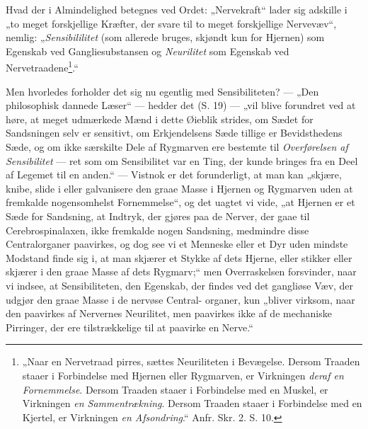 \documentclass[12pt,a4paper]{book}
\begin{document}
Hvad der i Almindelighed betegnes ved Ordet: „Nervekraft“ lader sig
adskille i „to meget forskjellige Kræfter, der svare til to meget
forskjellige Nervevæv“, nemlig: „\emph{Sensibililitet} (som allerede
bruges, skjøndt kun for Hjernen) som Egenskab ved Gangliesubstansen og
\emph{Neurilitet} som Egenskab ved
Nervetraadene\footnote{„Naar en Nervetraad pirres, sættes Neuriliteten i
Bevægelse. Dersom Traaden staaer i Forbindelse med Hjernen eller
Rygmarven, er Virkningen \emph{deraf en Fornemmelse}. Dersom Traaden
staaer i Forbindelse med en Muskel, er Virkningen \emph{en
Sammentrækning}. Dersom Traaden staaer i Forbindelse med en Kjertel, er
Virkningen \emph{en Afsondring}.“ Anfr. Skr. 2. S. 10.}.“

Men hvorledes forholder det sig nu egentlig med Sensibiliteten? --- „Den
philosophisk dannede Læser“ --- hedder det (S. 19) --- „vil blive
forundret ved at høre, at meget udmærkede Mænd i dette Øieblik strides,
om Sædet for Sandsningen selv er sensitivt, om Erkjendelsens Sæde tillige
er Bevidsthedens Sæde, og om ikke særskilte Dele af Rygmarven ere
bestemte til \emph{Overførelsen af Sensibilitet} --- ret som om
Sensibilitet var en Ting, der kunde bringes fra en Deel af Legemet til en
anden.“ --- Vistnok er det forunderligt, at man kan „skjære, knibe, slide
i eller galvanisere den graae Masse i Hjernen og Rygmarven uden at
fremkalde nogensomhelst Fornemmelse“, og det uagtet vi vide, „at Hjernen
er et Sæde for Sandsning, at Indtryk, der gjøres paa de Nerver, der gaae
til Cerebrospinalaxen, ikke fremkalde nogen Sandsning, medmindre disse
Centralorganer paavirkes, og dog see vi et Menneske eller et Dyr uden
mindste Modstand finde sig i, at man skjærer et Stykke af dets Hjerne,
eller stikker eller skjærer i den graae Masse af dets Rygmarv;“ men
Overraskelsen forsvinder, naar vi indsee, at Sensibiliteten, den
Egenskab, der findes ved det gangliøse Væv, der udgjør den graae Masse i
de nervøse Central-
\setcounter{footnote}{0}
organer, kun „bliver virksom, naar den paavirkes af Nervernes
Neurilitet, men paavirkes ikke af de mechaniske Pirringer, der ere
tilstrækkelige til at paavirke en Nerve.“
\end{document}
